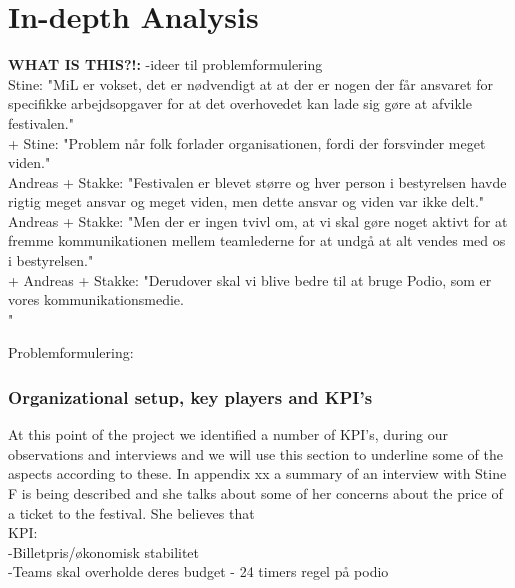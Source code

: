 \part{In-depth Analysis}

\textbf{WHAT IS THIS?!:}
-ideer til problemformulering\\
Stine: "MiL er vokset, det er nødvendigt at at der er nogen der får ansvaret for specifikke arbejdsopgaver for at det overhovedet kan lade sig gøre at afvikle festivalen."\\
+ Stine: "Problem når folk forlader organisationen, fordi der forsvinder meget viden."\\

Andreas + Stakke: "Festivalen er blevet større og hver person i bestyrelsen havde rigtig meget ansvar og meget viden, men dette ansvar og viden var ikke delt."\\

Andreas + Stakke: "Men der er ingen tvivl om, at vi skal gøre noget aktivt for at fremme kommunikationen mellem teamlederne for at undgå at alt vendes med os i bestyrelsen."\\

+ Andreas + Stakke: "Derudover skal vi blive bedre til at bruge Podio, som er vores kommunikationsmedie.\\"

Problemformulering:\\


\section{Organizational setup, key players and KPI's}
At this point of the project we identified a number of KPI's, during our observations and interviews and we will use this section to underline some of the aspects according to these.
In appendix xx a summary of an interview with Stine F is being described and she talks about some of her concerns about the price of a ticket to the festival. She believes that \\
KPI:\\
-Billetpris/økonomisk stabilitet\\
-Teams skal overholde deres budget
- 24 timers regel på podio
